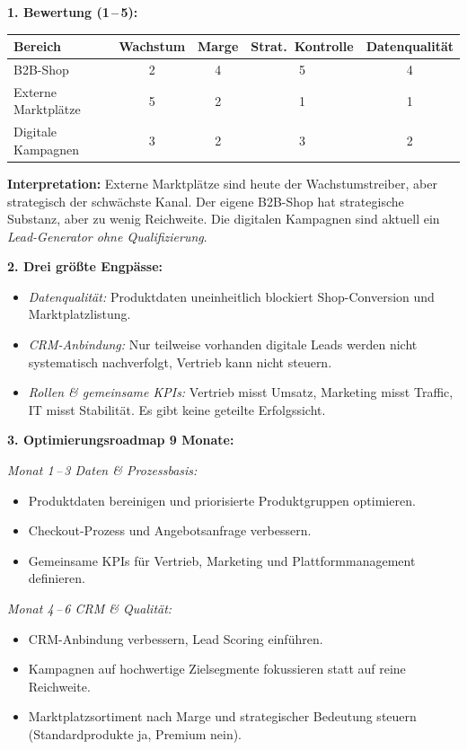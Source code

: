 \documentclass[11pt,a4paper,oneside]{article}
\begin{document}
\begin{loesungbox}
\textbf{1. Bewertung (1\,--\,5):}

\smallskip
\begin{tabularx}{\linewidth}{@{}lcccc@{}}
\toprule
\textbf{Bereich} & \textbf{Wachstum} & \textbf{Marge} & \textbf{Strat.\ Kontrolle} & \textbf{Datenqualität} \\
\midrule
B2B-Shop                & 2 & 4 & 5 & 4 \\
\midrule
Externe Marktplätze     & 5 & 2 & 1 & 1 \\
\midrule
Digitale Kampagnen      & 3 & 2 & 3 & 2 \\
\bottomrule
\end{tabularx}

\smallskip
\textbf{Interpretation:} Externe Marktplätze sind heute der Wachstumstreiber, aber strategisch der schwächste Kanal. Der eigene B2B-Shop hat strategische Substanz, aber zu wenig Reichweite. Die digitalen Kampagnen sind aktuell ein \emph{Lead-Generator ohne Qualifizierung}.

\smallskip
\textbf{2. Drei größte Engpässe:}
\begin{itemize}
  \item \emph{Datenqualität:} Produktdaten uneinheitlich \textendash{} blockiert Shop-Conversion und Marktplatzlistung.
  \item \emph{CRM-Anbindung:} Nur teilweise vorhanden \textendash{} digitale Leads werden nicht systematisch nachverfolgt, Vertrieb kann nicht steuern.
  \item \emph{Rollen \& gemeinsame KPIs:} Vertrieb misst Umsatz, Marketing misst Traffic, IT misst Stabilität. Es gibt keine geteilte Erfolgssicht.
\end{itemize}

\textbf{3. Optimierungsroadmap 9 Monate:}

\emph{Monat 1\,--\,3 \textendash{} Daten \& Prozessbasis:}
\begin{itemize}
  \item Produktdaten bereinigen und priorisierte Produktgruppen optimieren.
  \item Checkout-Prozess und Angebotsanfrage verbessern.
  \item Gemeinsame KPIs für Vertrieb, Marketing und Plattformmanagement definieren.
\end{itemize}

\emph{Monat 4\,--\,6 \textendash{} CRM \& Qualität:}
\begin{itemize}
  \item CRM-Anbindung verbessern, Lead Scoring einführen.
  \item Kampagnen auf hochwertige Zielsegmente fokussieren statt auf reine Reichweite.
  \item Marktplatzsortiment nach Marge und strategischer Bedeutung steuern (Standardprodukte ja, Premium nein).
\end{itemize}


\end{loesungbox}
\end{document}
